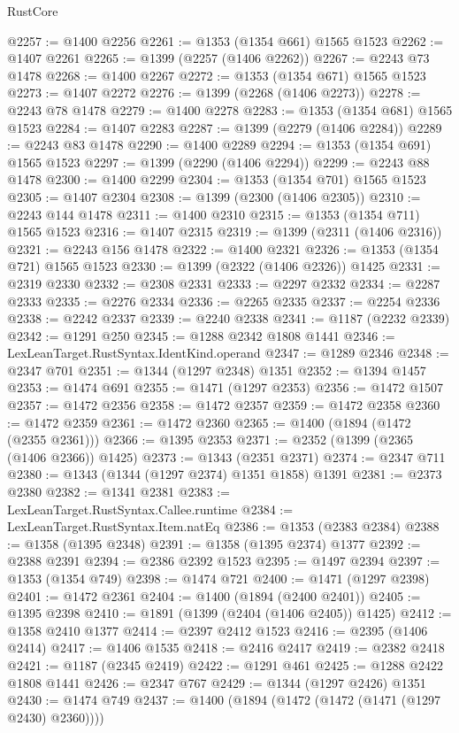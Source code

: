 \begin{lexlean}{RustCore}
\begin{coremodule}
@2257 := @1400 @2256
@2261 := @1353 (@1354 @661) @1565 @1523
@2262 := @1407 @2261
@2265 := @1399 (@2257 (@1406 @2262))
@2267 := @2243 @73 @1478
@2268 := @1400 @2267
@2272 := @1353 (@1354 @671) @1565 @1523
@2273 := @1407 @2272
@2276 := @1399 (@2268 (@1406 @2273))
@2278 := @2243 @78 @1478
@2279 := @1400 @2278
@2283 := @1353 (@1354 @681) @1565 @1523
@2284 := @1407 @2283
@2287 := @1399 (@2279 (@1406 @2284))
@2289 := @2243 @83 @1478
@2290 := @1400 @2289
@2294 := @1353 (@1354 @691) @1565 @1523
@2297 := @1399 (@2290 (@1406 @2294))
@2299 := @2243 @88 @1478
@2300 := @1400 @2299
@2304 := @1353 (@1354 @701) @1565 @1523
@2305 := @1407 @2304
@2308 := @1399 (@2300 (@1406 @2305))
@2310 := @2243 @144 @1478
@2311 := @1400 @2310
@2315 := @1353 (@1354 @711) @1565 @1523
@2316 := @1407 @2315
@2319 := @1399 (@2311 (@1406 @2316))
@2321 := @2243 @156 @1478
@2322 := @1400 @2321
@2326 := @1353 (@1354 @721) @1565 @1523
@2330 := @1399 (@2322 (@1406 @2326)) @1425
@2331 := @2319 @2330
@2332 := @2308 @2331
@2333 := @2297 @2332
@2334 := @2287 @2333
@2335 := @2276 @2334
@2336 := @2265 @2335
@2337 := @2254 @2336
@2338 := @2242 @2337
@2339 := @2240 @2338
@2341 := @1187 (@2232 @2339)
@2342 := @1291 @250
@2345 := @1288 @2342 @1808 @1441
@2346 := LexLeanTarget.RustSyntax.IdentKind.operand
@2347 := @1289 @2346
@2348 := @2347 @701
@2351 := @1344 (@1297 @2348) @1351
@2352 := @1394 @1457
@2353 := @1474 @691
@2355 := @1471 (@1297 @2353)
@2356 := @1472 @1507
@2357 := @1472 @2356
@2358 := @1472 @2357
@2359 := @1472 @2358
@2360 := @1472 @2359
@2361 := @1472 @2360
@2365 := @1400 (@1894 (@1472 (@2355 @2361)))
@2366 := @1395 @2353
@2371 := @2352 (@1399 (@2365 (@1406 @2366)) @1425)
@2373 := @1343 (@2351 @2371)
@2374 := @2347 @711
@2380 := @1343 (@1344 (@1297 @2374) @1351 @1858) @1391
@2381 := @2373 @2380
@2382 := @1341 @2381
@2383 := LexLeanTarget.RustSyntax.Callee.runtime
@2384 := LexLeanTarget.RustSyntax.Item.natEq
@2386 := @1353 (@2383 @2384)
@2388 := @1358 (@1395 @2348)
@2391 := @1358 (@1395 @2374) @1377
@2392 := @2388 @2391
@2394 := @2386 @2392 @1523
@2395 := @1497 @2394
@2397 := @1353 (@1354 @749)
@2398 := @1474 @721
@2400 := @1471 (@1297 @2398)
@2401 := @1472 @2361
@2404 := @1400 (@1894 (@2400 @2401))
@2405 := @1395 @2398
@2410 := @1891 (@1399 (@2404 (@1406 @2405)) @1425)
@2412 := @1358 @2410 @1377
@2414 := @2397 @2412 @1523
@2416 := @2395 (@1406 @2414)
@2417 := @1406 @1535
@2418 := @2416 @2417
@2419 := @2382 @2418
@2421 := @1187 (@2345 @2419)
@2422 := @1291 @461
@2425 := @1288 @2422 @1808 @1441
@2426 := @2347 @767
@2429 := @1344 (@1297 @2426) @1351
@2430 := @1474 @749
@2437 := @1400 (@1894 (@1472 (@1472 (@1471 (@1297 @2430) @2360))))

\end{coremodule}
\end{lexlean}
